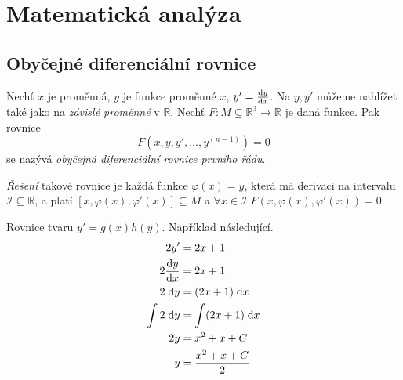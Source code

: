 \section{Matematická analýza}

\subsection{Obyčejné diferenciální rovnice}

\begin{definition}
Nechť $x$ je proměnná, $y$ je funkce proměnné $x$, $y' = \dv{y}{x}$.
Na $y, y'$ můžeme nahlížet také jako na {\em závislé proměnné}
v $\mathbb{R}$. Nechť $F : M \subseteq \mathbb{R}^3 \to \mathbb{R}$
je daná funkce. Pak rovnice
\[
    F(x,y,y',\ldots,y^{(n-1)}) = 0
\]
se nazývá {\em obyčejná diferenciální rovnice prvního řádu}.

{\em Řešení} takové rovnice je každá funkce $\varphi(x) = y$,
která má derivaci na intervalu $\mathcal{I} \subseteq \mathbb{R}$,
a platí $[x, \varphi(x), \varphi'(x)] \subseteq M$
a $\forall x \in \mathcal{I} \; F(x, \varphi(x), \varphi'(x)) = 0$.
\end{definition}

\begin{example}
Rovnice tvaru $y' = g(x) h(y)$. Například následující.
\begin{align*}
    2 y'             &=    2x + 1               \\
    2 \dv{y}{x}      &=    2x + 1               \\
    2 \; \text{d}y   &=   (2x + 1) \; \text{d}x \\
    \int 2 \; \text{d}y &= \int (2x + 1) \; \text{d}x \\
    2 y              &= x^2 + x +C               \\
      y              &= \frac{x^2 + x + C}{2}    \\
\end{align*}
\end{example}

